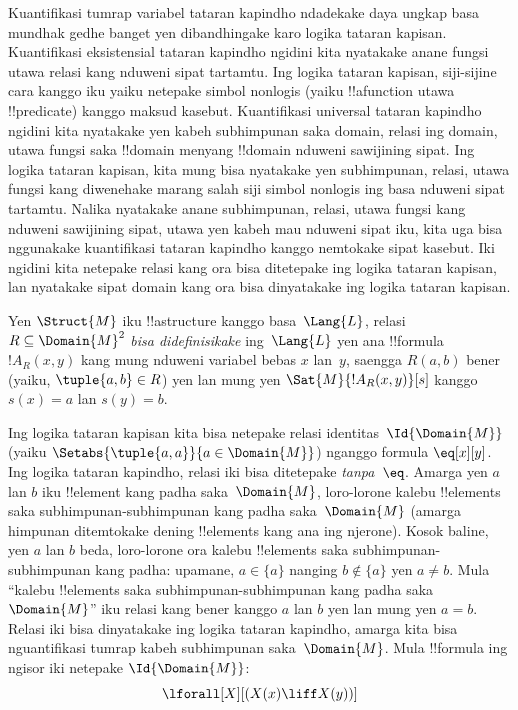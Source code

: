 \documentclass[../../../include/open-logic-section]{subfiles}
\begin{document}

\begin{explain}
Kuantifikasi tumrap variabel tataran kapindho ndadekake daya ungkap
basa mundhak gedhe banget yen dibandhingake karo logika tataran
kapisan. Kuantifikasi eksistensial tataran kapindho ngidini kita
nyatakake anane fungsi utawa relasi kang nduweni sipat tartamtu.
Ing logika tataran kapisan, siji-sijine cara kanggo iku yaiku
netepake simbol nonlogis (yaiku !!a{function} utawa
!!{predicate}) kanggo maksud kasebut. Kuantifikasi universal
tataran kapindho ngidini kita nyatakake yen kabeh subhimpunan saka
domain, relasi ing domain, utawa fungsi saka !!{domain}
menyang !!{domain} nduweni sawijining sipat. Ing logika tataran kapisan,
kita mung bisa nyatakake yen subhimpunan, relasi, utawa fungsi
kang diwenehake marang salah siji simbol nonlogis ing basa
nduweni sipat tartamtu. Nalika nyatakake anane subhimpunan,
relasi, utawa fungsi kang nduweni sawijining sipat, utawa yen
kabeh mau nduweni sipat iku, kita uga bisa nggunakake
kuantifikasi tataran kapindho kanggo nemtokake sipat kasebut.
Iki ngidini kita netepake relasi kang ora bisa ditetepake ing
logika tataran kapisan, lan nyatakake sipat domain kang ora bisa
dinyatakake ing logika tataran kapisan.
\end{explain}

\begin{defn}
Yen $\Struct{M}$ iku !!a{structure} kanggo basa~$\Lang{L}$,
relasi~$R \subseteq \Domain{M}^2$ \emph{bisa didefinisikake}
ing~$\Lang{L}$ yen ana !!{formula}~$!A_R(x, y)$ kang mung
nduweni variabel bebas $x$ lan~$y$, saengga $R(a, b)$ bener
(yaiku, $\tuple{a,b} \in R$) yen lan mung yen
$\Sat{M}{!A_R(x, y)}[s]$ kanggo $s(x) = a$ lan $s(y) = b$.
\end{defn}

\begin{ex}
Ing logika tataran kapisan kita bisa netepake relasi
identitas~$\Id{\Domain{M}}$ (yaiku
$\Setabs{\tuple{a,a}}{a \in \Domain{M}}$) nganggo formula
$\eq[x][y]$. Ing logika tataran kapindho, relasi iki bisa
ditetepake \emph{tanpa~$\eq$}. Amarga yen $a$ lan $b$ iku
!!{element} kang padha saka~$\Domain{M}$, loro-lorone
kalebu !!{element}s saka subhimpunan-subhimpunan kang padha
saka~$\Domain{M}$ (amarga himpunan ditemtokake dening
!!{element}s kang ana ing njerone). Kosok baline, yen $a$ lan $b$ beda,
loro-lorone ora kalebu !!{element}s saka subhimpunan-subhimpunan
kang padha: upamane, $a \in \{a\}$ nanging $b \notin \{a\}$
yen $a \neq b$. Mula ``kalebu !!{element}s saka
subhimpunan-subhimpunan kang padha saka~$\Domain{M}$''
iku relasi kang bener kanggo $a$ lan $b$ yen lan mung yen
$a = b$. Relasi iki bisa dinyatakake ing logika tataran kapindho,
amarga kita bisa nguantifikasi tumrap kabeh subhimpunan
saka~$\Domain{M}$. Mula !!{formula} ing ngisor iki
netepake $\Id{\Domain{M}}$:
\[
\lforall[X][(X(x) \liff X(y))]
\]
\end{ex}
\end{document}
